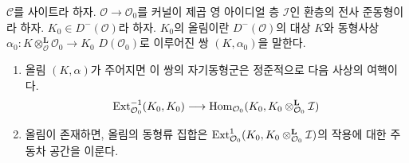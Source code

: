 \begin{lemma}
\label{lemma-first-order-defos-complex}
$\mathcal{C}$를 사이트라 하자. $\mathcal{O} \to \mathcal{O}_0$를
커널이 제곱 영 아이디얼 층 $\mathcal{I}$인 환층의 전사 준동형이라 하자.
$K_0 \in D^-(\mathcal{O})$라 하자. $K_0$의 올림이란
$D^-(\mathcal{O})$의 대상 $K$와 동형사상
$\alpha_0 : K \otimes_\mathcal{O}^\mathbf{L} \mathcal{O}_0 \to K_0$
$D(\mathcal{O}_0)$로 이루어진 쌍 $(K, \alpha_0)$을 말한다.
\begin{enumerate}
\item 올림 $(K, \alpha)$가 주어지면 이 쌍의 자기동형군은 정준적으로
다음 사상의 여핵이다.
$$
\mathop{\mathrm{Ext}}\nolimits^{-1}_{\mathcal{O}_0}(K_0, K_0)
\longrightarrow
\mathop{\mathrm{Hom}}\nolimits_{\mathcal{O}_0}(K_0, K_0 \otimes_{\mathcal{O}_0}^\mathbf{L} \mathcal{I})
$$
\item 올림이 존재하면, 올림의 동형류 집합은
$\mathop{\mathrm{Ext}}\nolimits^1_{\mathcal{O}_0}(K_0,
K_0 \otimes_{\mathcal{O}_0}^\mathbf{L} \mathcal{I})$의 작용에 대한
주동차 공간을 이룬다.
\end{enumerate}
\end{lemma}

